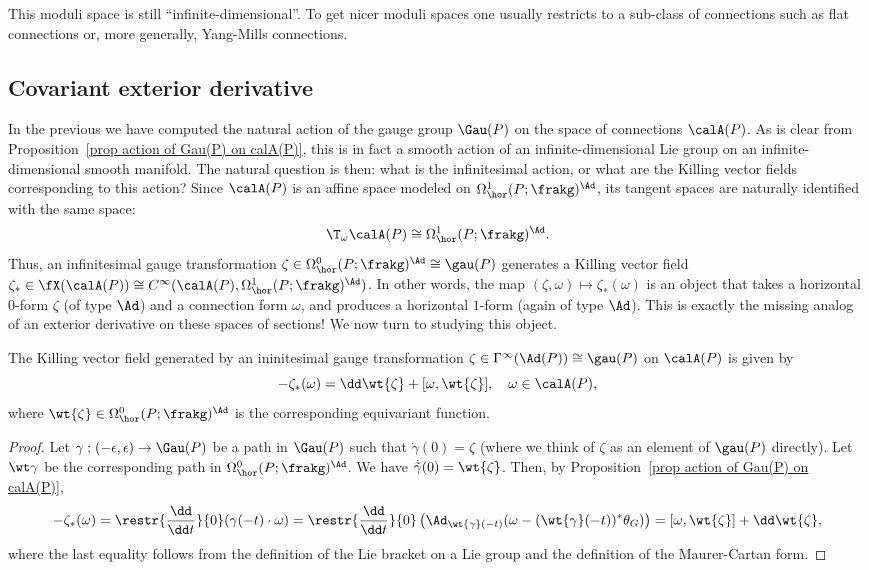 This moduli space is still ``infinite-dimensional''. To get nicer moduli spaces one usually restricts to a sub-class of connections such as flat connections or, more generally, Yang-Mills connections.







\subsection{Covariant exterior derivative}



In the previous \subsect we have computed the natural action of the gauge group $\Gau(P)$ on the space of connections $\calA(P)$. As is clear from Proposition~\ref{prop action of Gau(P) on calA(P)}, this is in fact a smooth action of an infinite-dimensional Lie group on an infinite-dimensional smooth manifold. The natural question is then: what is the infinitesimal action, or what are the Killing vector fields corresponding to this action? Since $\calA(P)$ is an affine space modeled on $\Omega^1_{\hor}(P;\frakg)^\Ad$, its tangent spaces are naturally identified with the same space:
\[\T_\omega\calA(P)\cong \Omega^1_{\hor}(P;\frakg)^\Ad.\]
Thus, an infinitesimal gauge transformation $\zeta\in\Omega^0_{\hor}(P;\frakg)^\Ad\cong\gau(P)$ generates a Killing vector field $\zeta_\ast\in \fX(\calA(P))\cong C^\infty(\calA(P),\Omega^1_{\hor}(P;\frakg)^\Ad)$. In other words, the map $(\zeta,\omega)\mapsto\zeta_\ast(\omega)$ is an object that takes a horizontal $0$-form $\zeta$ (of type $\Ad$) and a connection form $\omega$, and produces a horizontal $1$-form (again of type $\Ad$). This is exactly the missing analog of an exterior derivative on these spaces of sections! We now turn to studying this object.

\begin{prop}
    The Killing vector field generated by an ininitesimal gauge transformation $\zeta\in\Gamma^\infty(\Ad(P))\cong\gau(P)$ on $\calA(P)$ is given by
    \[-\zeta_\ast(\omega)=\dd \wt{\zeta}+[\omega,\wt{\zeta}],\quad \omega\in\calA(P),\]
    where $\wt{\zeta}\in \Omega^0_{\hor}(P;\frakg)^\Ad$ is the corresponding equivariant function.
\end{prop}
\begin{proof}
    Let $\gamma:(-\epsilon,\epsilon)\to \Gau(P)$ be a path in $\Gau(P)$ such that $\dot\gamma(0)=\zeta$ (where we think of $\zeta$ as an element of $\gau(P)$ directly). Let $\wt\gamma$ be the corresponding path in $\Omega^0_{\hor}(P;\frakg)^\Ad$. We have $\dot{\tilde{\gamma}}(0)=\wt{\zeta}$. Then, by Proposition~\ref{prop action of Gau(P) on calA(P)},
    \[-\zeta_\ast(\omega)=\restr{\frac{\dd}{\dd t}}{0}(\gamma(-t)\cdot \omega)=\restr{\frac{\dd}{\dd t}}{0}\left(\Ad_{\wt{\gamma}(-t)}(\omega-(\wt{\gamma}(-t))^\ast\theta_G)\right)=[\omega,\wt{\zeta}]+\dd\wt{\zeta},\]
    where the last equality follows from the definition of the Lie bracket on a Lie group and the definition of the Maurer-Cartan form.
\end{proof}


